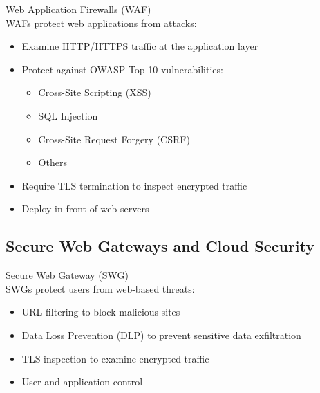 \begin{definition}{Web Application Firewalls (WAF)}\\
WAFs protect web applications from attacks:
\begin{itemize}
    \item Examine HTTP/HTTPS traffic at the application layer
    \item Protect against OWASP Top 10 vulnerabilities:
    \begin{itemize}
        \item Cross-Site Scripting (XSS)
        \item SQL Injection
        \item Cross-Site Request Forgery (CSRF)
        \item Others
    \end{itemize}
    \item Require TLS termination to inspect encrypted traffic
    \item Deploy in front of web servers
\end{itemize}
\end{definition}

\subsection{Secure Web Gateways and Cloud Security}

\begin{definition}{Secure Web Gateway (SWG)}\\
SWGs protect users from web-based threats:
\begin{itemize}
    \item URL filtering to block malicious sites
    \item Data Loss Prevention (DLP) to prevent sensitive data exfiltration
    \item TLS inspection to examine encrypted traffic
    \item User and application control
\end{itemize}
\end{definition}

